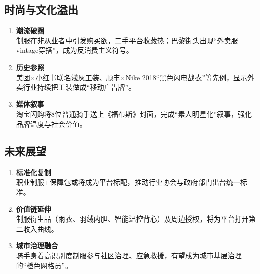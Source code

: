 \subsection{时尚与文化溢出}
\begin{enumerate}[leftmargin=*, nosep]
    \item \textbf{潮流破圈}  \\
    制服在非从业者中引发购买欲，二手平台收藏热；巴黎街头出现“外卖服vintage穿搭”，成为反消费主义符号。  
    \item \textbf{历史参照}  \\
    美团×小红书联名浅灰工装、顺丰×Nike 2018“黑色闪电战衣”等先例，显示外卖行业持续把工装做成“移动广告牌”。
    \item \textbf{媒体叙事}  \\
    淘宝闪购将8位普通骑手送上《福布斯》封面，完成“素人明星化”叙事，强化品牌温度与社会价值。
\end{enumerate}

\subsection{未来展望}
\begin{enumerate}[leftmargin=*, nosep]
    \item \textbf{标准化复制}  \\
    职业制服+保障包或将成为平台标配，推动行业协会与政府部门出台统一标准。
    \item \textbf{价值链延伸}  \\
    制服衍生品（雨衣、羽绒内胆、智能温控背心）及周边授权，将为平台打开第二收入曲线。
    \item \textbf{城市治理融合}  \\
    骑手身着高识别度制服参与社区治理、应急救援，有望成为城市基层治理的“橙色网格员”。
\end{enumerate}